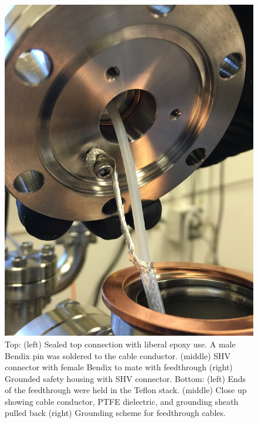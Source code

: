 \begin{figure}[htbp]
\begin{minipage}{0.32\textwidth}
    \includegraphics[width=\linewidth, angle=270]{figures/testbed/ft6_3.jpg}
    \end{minipage}
    
    
\caption{Top: (left) Sealed top connection with liberal epoxy use. A male Bendix pin was soldered to the cable conductor. (middle) SHV connector with female Bendix to mate with feedthrough (right) Grounded safety housing with SHV connector. Bottom: (left) Ends of the feedthrough were held in the Teflon stack. (middle) Close up showing cable conductor, \ac{PTFE} dielectric, and grounding sheath pulled back (right) Grounding scheme for feedthrough cables.}
 \label{fig:cableft}
\end{figure}


